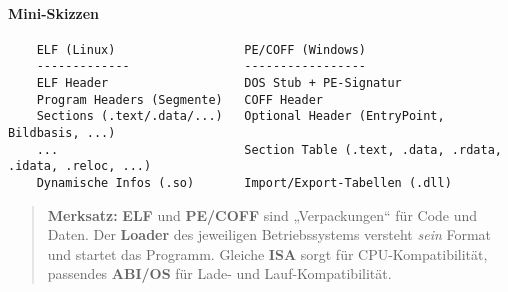 \documentclass[../skript/main.tex]{subfiles}
\begin{document}
\paragraph{Mini-Skizzen}
\begin{verbatim}
	ELF (Linux)                  PE/COFF (Windows)
	-------------                -----------------
	ELF Header                   DOS Stub + PE-Signatur
	Program Headers (Segmente)   COFF Header
	Sections (.text/.data/...)   Optional Header (EntryPoint, Bildbasis, ...)
	...                          Section Table (.text, .data, .rdata, .idata, .reloc, ...)
	Dynamische Infos (.so)       Import/Export-Tabellen (.dll)
\end{verbatim}

\begin{quote}\small
	\textbf{Merksatz:} \textbf{ELF} und \textbf{PE/COFF} sind „Verpackungen“ für Code und Daten.  
	Der \textbf{Loader} des jeweiligen Betriebssystems versteht \emph{sein} Format und startet das Programm.
	Gleiche \textbf{ISA} sorgt für CPU-Kompatibilität, passendes \textbf{ABI/OS} für Lade- und Lauf-Kompatibilität.
\end{quote}

	
\end{document}
